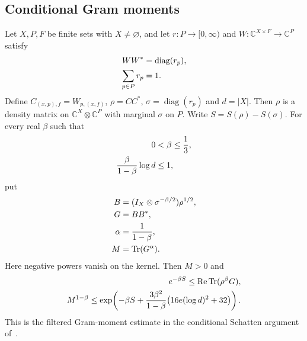 \subsection{Conditional Gram moments}
\label{sec:conditional_gram_moments}

\begin{lemma}
    \label{lem:conditional_filtered_gram_moment}
    \leanok
    Let $X,P,F$ be finite sets with $X\ne\varnothing$, and let
    $r:P\to[0,\infty)$ and
    $W:\mathbb C^{X\times F}\to\mathbb C^P$ satisfy
    \begin{align}
        WW^*&=\operatorname{diag}(r_p),\notag\\
        \sum_{p\in P}r_p&=1.\notag
    \end{align}
    Define $C_{(x,p),f}=W_{p,(x,f)}$, $\rho=CC^*$,
    $\sigma=\operatorname{diag}(r_p)$ and $d=|X|$. Then $\rho$ is a
    density matrix on $\mathbb C^X\otimes\mathbb C^P$ with marginal
    $\sigma$ on $P$. Write $S=S(\rho)-S(\sigma)$.
    For every real $\beta$ such that
    \begin{align}
        0&<\beta\le\frac13,\notag\\
        \frac{\beta}{1-\beta}\log d&\le1,\notag
    \end{align}
    put
    \begin{align}
        B&=(I_X\otimes\sigma^{-\beta/2})\rho^{1/2},\notag\\
        G&=BB^*,\notag\\
        \alpha&=\frac1{1-\beta},\notag\\
        M&=\operatorname{Tr}(G^\alpha).\notag
    \end{align}
    Here negative powers vanish on the kernel. Then $M>0$ and
    \begin{align}
        e^{-\beta S}\le\operatorname{Re}\operatorname{Tr}(\rho^\beta G),\notag\\
        M^{1-\beta}
        \le\exp\!\left(-\beta S+
          \frac{3\beta^2}{1-\beta}
            \bigl(16e(\log d)^2+32\bigr)\right).\notag
    \end{align}
    This is the filtered Gram-moment estimate in the conditional Schatten
    argument of~\cite[Section~5.1]{OpenAI2026AreaLaw}.
\end{lemma}

